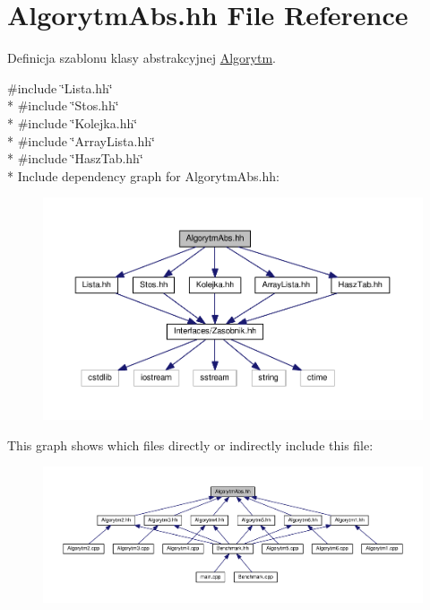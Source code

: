 \hypertarget{a00030}{}\section{Algorytm\+Abs.\+hh File Reference}
\label{a00030}


Definicja szablonu klasy abstrakcyjnej \hyperlink{a00001}{Algorytm}.  


{\ttfamily \#include \char`\"{}Lista.\+hh\char`\"{}}\\*
{\ttfamily \#include \char`\"{}Stos.\+hh\char`\"{}}\\*
{\ttfamily \#include \char`\"{}Kolejka.\+hh\char`\"{}}\\*
{\ttfamily \#include \char`\"{}Array\+Lista.\+hh\char`\"{}}\\*
{\ttfamily \#include \char`\"{}Hasz\+Tab.\+hh\char`\"{}}\\*
Include dependency graph for Algorytm\+Abs.\+hh\+:
\nopagebreak
\begin{figure}[H]
\begin{center}
\leavevmode
\includegraphics[width=350pt]{a00071}
\end{center}
\end{figure}
This graph shows which files directly or indirectly include this file\+:
\nopagebreak
\begin{figure}[H]
\begin{center}
\leavevmode
\includegraphics[width=350pt]{a00072}
\end{center}
\end{figure}
